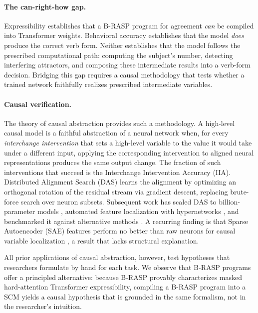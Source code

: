 \documentclass[11pt]{article}
\begin{document}
\paragraph{The can-right-how gap.}
Expressibility establishes that a B-RASP program for agreement \emph{can} be compiled into Transformer weights.
Behavioral accuracy establishes that the model \emph{does} produce the correct verb form.
Neither establishes that the model follows the prescribed computational path: computing the subject's number, detecting interfering attractors, and composing these intermediate results into a verb-form decision.
Bridging this gap requires a causal methodology that tests whether a trained network faithfully realizes prescribed intermediate variables.

\paragraph{Causal verification.}
The theory of causal abstraction \citep{DBLP:journals/jmlr/GeigerIZCC0AWGP25} provides such a methodology.
A high-level causal model is a faithful abstraction of a neural network when, for every \emph{interchange intervention} that sets a high-level variable to the value it would take under a different input, applying the corresponding intervention to aligned neural representations produces the same output change.
The fraction of such interventions that succeed is the Interchange Intervention Accuracy (IIA).
Distributed Alignment Search (DAS) learns the alignment by optimizing an orthogonal rotation of the residual stream via gradient descent, replacing brute-force search over neuron subsets.
Subsequent work has scaled DAS to billion-parameter models \citep{DBLP:conf/nips/WuGIPG23}, automated feature localization with hypernetworks \citep{DBLP:conf/iclr/Sun0BDPSG25}, and benchmarked it against alternative methods \citep{DBLP:conf/acl/HuangWPGG24,DBLP:conf/icml/MuellerGWAABCFH25}.
A recurring finding is that Sparse Autoencoder (SAE) features perform no better than raw neurons for causal variable localization \citep{DBLP:conf/icml/MuellerGWAABCFH25}, a result that lacks structural explanation.

All prior applications of causal abstraction, however, test hypotheses that researchers formulate by hand for each task.
We observe that B-RASP programs offer a principled alternative: because B-RASP provably characterizes masked hard-attention Transformer expressibility, compiling a B-RASP program into a SCM yields a causal hypothesis that is grounded in the same formalism, not in the researcher's intuition.
\end{document}
